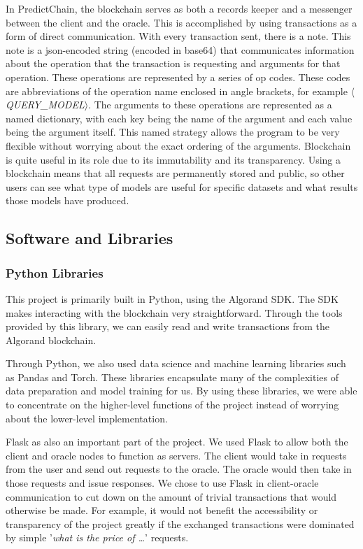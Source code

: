 \documentclass{article}
\begin{document}
    In PredictChain, the blockchain serves as both a records keeper and a messenger between the client and the oracle.
    This is accomplished by using transactions as a form of direct communication.  With every transaction sent, there is a note.
    This note is a json-encoded string (encoded in base64) that communicates information about the operation that the transaction
    is requesting and arguments for that operation.  These operations are represented by a series
    of op codes.  These codes are abbreviations of the operation name enclosed in angle brackets, for example $\langle$\textit{QUERY\_MODEL}$\rangle$.
    The arguments to these operations are represented as a named dictionary, with each key being the name of the argument and each
    value being the argument itself.  This named strategy allows the program to be very flexible without worrying about the exact
    ordering of the arguments.  Blockchain is quite useful in its role due to its immutability and its transparency.  Using
    a blockchain means that all requests are permanently stored and public, so other users can see what type of models are useful
    for specific datasets and what results those models have produced.

    \subsection{Software and Libraries}
    
    \subsubsection*{Python Libraries}
    
    This project is primarily built in Python, using the Algorand SDK.  The SDK makes interacting with the blockchain
    very straightforward.  Through the tools provided by this library, we can easily read and write transactions from
    the Algorand blockchain.

    Through Python, we also used data science and machine learning libraries such as Pandas
    and Torch.  These libraries encapsulate many of the complexities of data preparation and model training for us.
    By using these libraries, we were able to concentrate on the higher-level functions of the project instead of worrying
    about the lower-level implementation.

    Flask as also an important part of the project.  We used Flask to allow both
    the client and oracle nodes to function as servers.  The client would take in requests from the user and send out
    requests to the oracle.  The oracle would then take in those requests and issue responses.  We chose to use Flask in
    client-oracle communication to cut down on the amount of trivial transactions that would otherwise be made.  For example,
    it would not benefit the accessibility or transparency of the project greatly if the exchanged transactions were
    dominated by simple '\textit{what is the price of \ldots}' requests.
    
\end{document}
